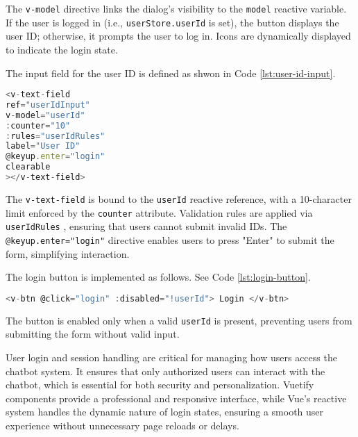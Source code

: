 The \texttt{v-model} directive links the dialog's visibility to the \texttt{model}
reactive variable. If the user is logged in (i.e., \texttt{userStore.userId}
is set), the button displays the user \acs{ID}; otherwise, it prompts the user to log in. Icons are dynamically displayed to
indicate the login state.

The input field for the user \acs{ID} is defined as shwon in Code \ref{lst:user-id-input}.

\begin{lstlisting}[language=JavaScript, caption={User ID Input Field (\texttt{UserLoginDialog.vue})},
firstnumber=57,label={lst:user-id-input}]
<v-text-field
ref="userIdInput"
v-model="userId"
:counter="10"
:rules="userIdRules"
label="User ID"
@keyup.enter="login"
clearable
></v-text-field>
\end{lstlisting}

The \texttt{v-text-field} is bound to the \texttt{userId} reactive reference, with a 10-character limit enforced by the
\texttt{counter} attribute. Validation rules are applied via \texttt{userIdRules}
, ensuring that users cannot submit invalid \acsp{ID}. The \texttt{@keyup.enter="login"}
directive enables users to press "Enter" to submit the form, simplifying interaction.

The login button is implemented as follows. See Code \ref{lst:login-button}.

\begin{lstlisting}[language=JavaScript, caption={Login Button (\texttt{UserLoginDialog.vue})},
firstnumber=70,label={lst:login-button}]
<v-btn @click="login" :disabled="!userId"> Login </v-btn>
\end{lstlisting}

The button is enabled only when a valid \texttt{userId}
is present, preventing users from submitting the form without valid input.

User login and session handling are critical for managing how users access the chatbot system. It ensures that only
authorized users can interact with the chatbot, which is essential for both security and personalization. Vuetify
components provide a professional and responsive interface, while Vue’s reactive system handles the dynamic nature of
login states, ensuring a smooth user experience without unnecessary page reloads or delays.